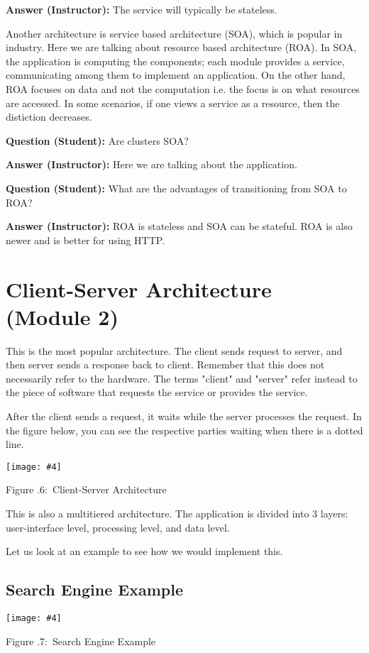 \documentclass[twoside]{article}
\newcounter{lecnum}
\newcommand{\fig}[4]{
            \centerline{\texttt{[image: \#4]}}
            \begin{center}
            Figure \thelecnum.#1:~#3
            \end{center}
    }
\begin{document}
\textbf{Answer (Instructor): } The service will typically be stateless.

Another architecture is service based architecture (SOA), which is popular in industry. Here we are talking about resource based architecture (ROA). In SOA, the application is computing the components; each module provides a service, communicating among them to implement an application. On the other hand, ROA focuses on data and not the computation i.e. the focus is on what resources are accessed. In some scenarios, if one views a service as a resource, then the distiction decreases.

\textbf{Question (Student): } Are clusters SOA?

\textbf{Answer (Instructor): } Here we are talking about the application.

\textbf{Question (Student): } What are the advantages of transitioning from SOA to ROA?

\textbf{Answer (Instructor): } ROA is stateless and SOA can be stateful. ROA is also newer and is better for using HTTP.












\section{Client-Server Architecture (Module 2)}

This is the most popular architecture.  The client sends request to server, and then server sends a response back to client. Remember that this does not necessarily refer to the hardware. The terms "client" and "server" refer instead to the piece of software that requests the service or provides the service. 

After the client sends a request, it waits while the server processes the request. In the figure below, you can see the respective parties waiting when there is a dotted line.

\fig{6}{0.3}{Client-Server Architecture}{clientServer.png}

This is also a multitiered architecture. The application is divided into 3 layers: user-interface level, processing level, and data level.

Let us look at an example to see how we would implement this.


\subsection{Search Engine Example}
\fig{7}{0.5}{Search Engine Example}{searchengine.png}
\end{document}
